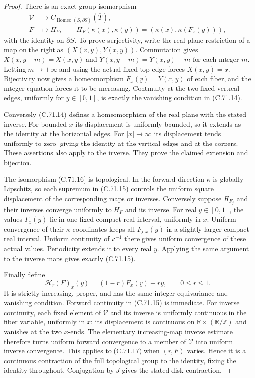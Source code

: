 \begin{proof}
There is an exact group isomorphism
\[
 \begin{split}
 \mathcal V&\longrightarrow
       C_{\operatorname{Homeo}(S,\partial S)}(\overline T),\\
 F&\longmapsto H_F,\qquad
 H_F(\kappa(x),\kappa(y))
          =(\kappa(x),\kappa(F_x(y))),
 \end{split}                                                   \tag{C.71.16}
\]
with the identity on $\partial S$. To prove surjectivity,
write the real-plane restriction of a map on the right
as $(X(x,y),Y(x,y))$. Commutation gives
$X(x,y+m)=X(x,y)$ and
$Y(x,y+m)=Y(x,y)+m$ for each integer $m$.
Letting $m\to+\infty$ and using the actual fixed top
edge forces $X(x,y)=x$. Bijectivity now gives a
homeomorphism $F_x(y)=Y(x,y)$ of each fiber, and the
integer equation forces it to be increasing.
Continuity at the two fixed vertical edges,
uniformly for $y\in[0,1]$, is exactly the vanishing
condition in (C.71.14).

Conversely (C.71.14) defines a homeomorphism of
the real plane with the stated inverse. For
bounded $x$ its displacement is uniformly bounded,
so it extends as the identity at the horizontal
edges. For $|x|\to\infty$ its displacement tends
uniformly to zero, giving the identity at the
vertical edges and at the corners. These assertions
also apply to the inverse. They prove the claimed
extension and bijection.

The isomorphism (C.71.16) is topological. In the
forward direction $\kappa$ is globally Lipschitz,
so each supremum in (C.71.15) controls the uniform
square displacement of the corresponding maps or
inverses. Conversely suppose $H_{F_j}$ and their
inverses converge uniformly to $H_F$ and its inverse.
For real $y\in[0,1]$, the values $F_x(y)$ lie in
one fixed compact real interval, uniformly in $x$.
Uniform convergence of their $\kappa$-coordinates
keeps all $F_{j,x}(y)$ in a slightly larger compact
real interval. Uniform continuity of $\kappa^{-1}$
there gives uniform convergence of these actual
values. Periodicity extends it to every real $y$.
Applying the same argument to the inverse maps
gives exactly (C.71.15).

Finally define
\[
       \mathcal H_r(F)_x(y)
                      =(1-r)F_x(y)+ry,\qquad 0\leq r\leq1 .
                                                               \tag{C.71.17}
\]
It is strictly increasing, proper, and has the
same integer equivariance and vanishing condition.
Forward continuity in (C.71.15) is immediate.
For inverse continuity, each fixed element of
$\mathcal V$ and its inverse is uniformly continuous
in the fiber variable, uniformly in $x$: its
displacement is continuous on
$\mathbb R\times(\mathbb R/\mathbb Z)$ and vanishes
at the two $x$-ends. The elementary increasing-map
inverse estimate therefore turns uniform forward
convergence to a member of $\mathcal V$ into uniform
inverse convergence. This applies to (C.71.17)
when $(r,F)$ varies. Hence it is a continuous
contraction of the full topological group to the
identity, fixing the identity throughout.
Conjugation by $J$ gives the stated disk contraction.


\end{proof}
